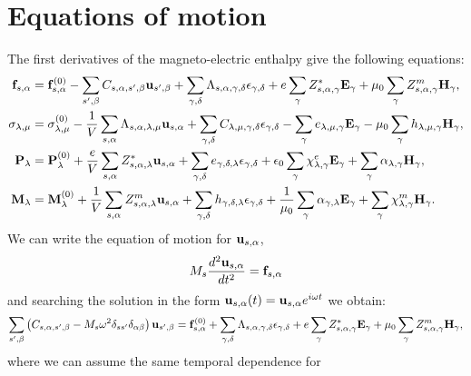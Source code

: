 \documentclass[12pt,a4paper]{article}
\begin{document}
\section{\color{coral}Equations of motion}
The first derivatives of the magneto-electric enthalpy give the following equations:
\begin{align}
{\bf f}_{s,\alpha}&= {\bf f}^{(0)}_{s,\alpha}
-\sum_{s',\beta} C_{s,\alpha,s',\beta} {\bf u}_{s',\beta}
+\sum_{\gamma,\delta}
\Lambda_{s,\alpha,\gamma,\delta} 
\epsilon_{\gamma,\delta} +
e \sum_{\gamma} Z^*_{s,\alpha,\gamma} {\bf E}_{\gamma}
+\mu_0 \sum_{\gamma} 
Z^m_{s,\alpha,\gamma} {\bf H}_{\gamma}, \\
\sigma_{\lambda,\mu}&= \sigma_{\lambda,\mu}^{(0)}
-{1\over V} \sum_{s,\alpha}
\Lambda_{s,\alpha,\lambda,\mu} {\bf u}_{s,\alpha}
+\sum_{\gamma,\delta} C_{\lambda,\mu,\gamma,\delta}  
\epsilon_{\gamma,\delta} -
\sum_{\gamma} e_{\lambda,\mu,\gamma} 
 {\bf E}_{\gamma}
-\mu_0 \sum_{\gamma}  h_{\lambda,\mu,\gamma} 
{\bf H}_{\gamma}, \\
{\bf P}_{\lambda}&= {\bf P}^{(0)}_{\lambda}
+{e\over V} \sum_{s,\alpha} Z^*_{s,\alpha,\lambda} 
{\bf u}_{s,\alpha} +
\sum_{\gamma,\delta} e_{\gamma,\delta,\lambda} 
\epsilon_{\gamma,\delta} +
\epsilon_0 \sum_{\gamma} 
\chi^e_{\lambda,\gamma}
{\bf E}_{\gamma} +
\sum_{\gamma} \alpha_{\lambda,\gamma} 
{\bf H}_{\gamma}, \\
{\bf M}_{\lambda}&= {\bf M}^{(0)}_{\lambda}
+{1\over V}\sum_{s,\alpha} 
Z^m_{s,\alpha,\lambda} {\bf u}_{s,\alpha} +
\sum_{\gamma,\delta}  h_{\gamma,\delta,\lambda} 
\epsilon_{\gamma,\delta} 
+{1\over \mu_0} \sum_{\gamma} \alpha_{\gamma,\lambda} {\bf E}_{\gamma}
+\sum_{\gamma} 
\chi^m_{\lambda,\gamma}
{\bf H}_{\gamma}.
\end{align}
We can write the equation of motion for ${\bf u}_{s,\alpha}$, 
\begin{equation}
M_s {d^2 {\bf u}_{s,\alpha} \over d t^2} = {\bf f}_{s,\alpha}
\end{equation}
and searching the solution in the form ${\bf u}_{s,\alpha}(t)=
{\bf u}_{s,\alpha} e^{i\omega t}$ we obtain:
\begin{equation}
\sum_{s',\beta} \left(C_{s,\alpha,s',\beta} - 
M_s \omega^2 \delta_{ss'}\delta_{\alpha\beta}\right)
{\bf u}_{s',\beta}= {\bf f}^{(0)}_{s,\alpha} + \sum_{\gamma,\delta} 
\Lambda_{s,\alpha,\gamma,\delta} \epsilon_{\gamma,\delta}
+ e \sum_{\gamma} Z^*_{s,\alpha,\gamma} {\bf E}_{\gamma} 
+ \mu_0 \sum_{\gamma} Z^m_{s,\alpha,\gamma} 
{\bf H}_{\gamma},
\end{equation}
where we can assume the same temporal dependence for 
\end{document}
